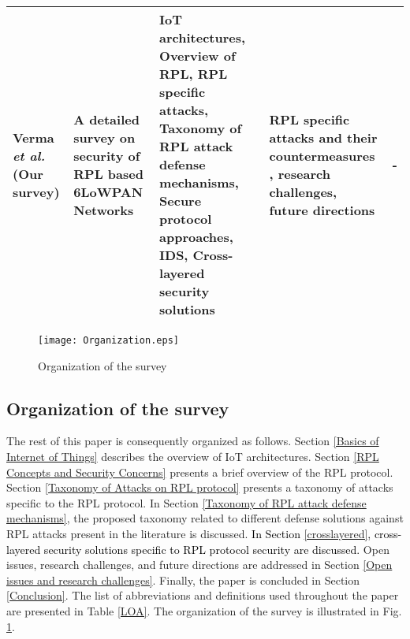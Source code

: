 \documentclass[10pt,journal,sort & compress]{IEEEtran}
\begin{document}
\begin{table*}[!h]
\begin{tabular}{|p{2cm}|p{3.1cm}|p{4.7cm}|p{3.7cm}|p{2.3cm}|}
		Verma \textit{et al.} (Our survey) & A detailed survey on security of RPL based 6LoWPAN Networks & IoT architectures, Overview of RPL, RPL specific  attacks, Taxonomy of RPL attack defense mechanisms, Secure  protocol approaches, IDS, Cross-layered security solutions & RPL specific attacks and their countermeasures , research challenges, future directions & - \\ \hline
	\end{tabular}
\end{table*}


\begin{figure}[!h]
	\centering
	\texttt{[image: Organization.eps]}
	\caption{Organization of the survey}
	\label{org}
\end{figure}

\subsection{Organization of the survey}

The rest of this paper is consequently organized as follows. Section \ref{Basics of Internet of Things} describes the overview of IoT architectures.
Section \ref{RPL Concepts and Security Concerns} presents a brief overview of the RPL protocol. Section \ref{Taxonomy of Attacks on RPL protocol} presents a taxonomy of attacks specific to the RPL protocol. In Section \ref{Taxonomy of RPL attack defense mechanisms}, the proposed taxonomy related to different defense solutions against RPL attacks present in the literature is discussed. \textcolor{black}{In Section \ref{crosslayered}, cross-layered security solutions specific to RPL protocol security are discussed.} Open issues, research challenges, and future directions are addressed in Section \ref{Open issues and research challenges}. Finally, the paper is concluded in Section \ref{Conclusion}. The list of abbreviations and definitions used throughout the paper are presented in Table \ref{LOA}. The organization of the survey is illustrated in Fig. \ref{org}.
\end{document}
